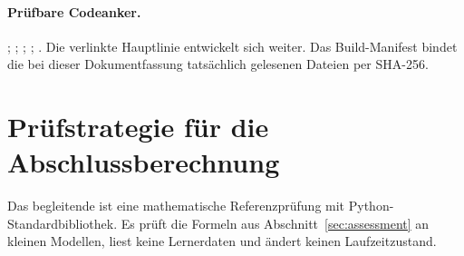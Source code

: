 \paragraph{Prüfbare Codeanker.}
;
;
;
;
.
Die verlinkte Hauptlinie entwickelt sich weiter. Das Build-Manifest bindet
die bei dieser Dokumentfassung tatsächlich gelesenen Dateien per SHA-256.

\section{Prüfstrategie für die Abschlussberechnung}
\label{sec:test-strategy}
Das begleitende  ist eine
mathematische Referenzprüfung mit Python-Standardbibliothek. Es prüft die
Formeln aus Abschnitt~\ref{sec:assessment} an kleinen Modellen, liest keine
Lernerdaten und ändert keinen Laufzeitzustand.

